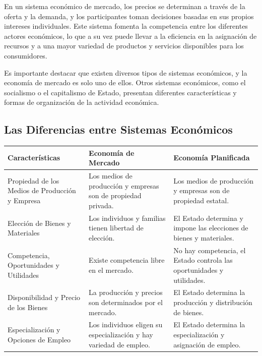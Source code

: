 \documentclass[
  doc,
  floatsintext,
  longtable,
  a4paper,
  nolmodern,
  notxfonts,
  notimes,
  12pt,
  colorlinks=true,linkcolor=blue,citecolor=blue,urlcolor=blue]{apa7}
\newcounter{none} %
\begin{document}
En un sistema económico de mercado, los precios se determinan a través
de la oferta y la demanda, y los participantes toman decisiones basadas
en sus propios intereses individuales. Este sistema fomenta la
competencia entre los diferentes actores económicos, lo que a su vez
puede llevar a la eficiencia en la asignación de recursos y a una mayor
variedad de productos y servicios disponibles para los consumidores.

Es importante destacar que existen diversos tipos de sistemas
económicos, y la economía de mercado es solo uno de ellos. Otros
sistemas económicos, como el socialismo o el capitalismo de Estado,
presentan diferentes características y formas de organización de la
actividad económica.

\subsection{Las Diferencias entre Sistemas
Económicos}\label{las-diferencias-entre-sistemas-econuxf3micos}

{\def\LTcaptype{none} %
\begin{longtable}[]{@{}
  >{\raggedright\arraybackslash}p{}
  >{\raggedright\arraybackslash}p{}
  >{\raggedright\arraybackslash}p{}@{}}
\toprule\noalign{}
\begin{minipage}[b]{\linewidth}\raggedright
Características
\end{minipage} & \begin{minipage}[b]{\linewidth}\raggedright
Economía de Mercado
\end{minipage} & \begin{minipage}[b]{\linewidth}\raggedright
Economía Planificada
\end{minipage} \\
\midrule\noalign{}
\endhead
\bottomrule\noalign{}
\endlastfoot
Propiedad de los Medios de Producción y Empresa & Los medios de
producción y empresas son de propiedad privada. & Los medios de
producción y empresas son de propiedad estatal. \\
Elección de Bienes y Materiales & Los individuos y familias tienen
libertad de elección. & El Estado determina y impone las elecciones de
bienes y materiales. \\
Competencia, Oportunidades y Utilidades & Existe competencia libre en el
mercado. & No hay competencia, el Estado controla las oportunidades y
utilidades. \\
Disponibilidad y Precio de los Bienes & La producción y precios son
determinados por el mercado. & El Estado determina la producción y
distribución de bienes. \\
Especialización y Opciones de Empleo & Los individuos eligen su
especialización y hay variedad de empleo. & El Estado determina la
especialización y asignación de empleo. \\
\end{longtable}
}
\end{document}
